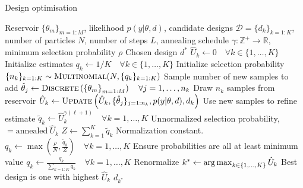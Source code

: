 \begin{algorithm}[t]
	\small
	\captionsetup{labelfont=bf, justification=justified,singlelinecheck=false}
	\caption{Design optimisation \label{alg:des-opt}}
	\begin{algorithmic}[1]
		\renewcommand{\algorithmicrequire}{\textbf{Inputs:}}
		\renewcommand{\algorithmicensure}{\textbf{Outputs:}}				 
		\Require Reservoir $\{\theta_m\}_{m=1:M}$, likelihood $p(y | \theta, d)$,
		candidate designs $\mathcal{D} = \{d_k\}_{k=1:K}$, number of particles $N$, number of steps
		$L$, annealing schedule $\gamma : \mathbb{Z}^+ \rightarrow \mathbb{R}$, minimum selection probability $\rho$
		\Ensure Chosen design $d^*$
		\State $\hat{U}_k \leftarrow 0 \quad \forall k \in \{1,\dots,K\}$ \Comment Initialize estimates
		\State $q_k \leftarrow 1/K \quad \forall k \in \{1,\dots,K\}$ \Comment Initialize selection probability
		\State $\{n_k\}_{k=1:K} \sim \textsc{Multinomial}(N,\{q_k\}_{k=1:K})$ \label{line:des-opt:sample-nsamples}
		\Comment Sample number of new samples to add
		\State $\hat{\theta}_{j} \leftarrow \textsc{Discrete}\left(\left\{\theta_m\right\}_{m=1:M}\right) \quad \forall j=1,\dots,n_k$ \label{line:des-opt:draw-theta}
		\Comment Draw $n_k$ samples from reservoir
		\State $\hat{U}_k \leftarrow \textsc{Update}\left(\hat{U}_k,\{\hat{\theta}_j\}_{j=1:n_k},p(y | \theta, d),d_k\right)$
		\label{line:des-opt:refine-U}
		\Comment Use new samples to refine estimate %
		\EndFor	
		\State $\tilde{q}_k \leftarrow \hat{U}_k^{\gamma(\ell+1)} \quad \forall k = 1,\dots,K$ 
		\label{line:des-opt:set-p}
		\Comment Unnormalized selection probability, $=\text{annealed} ~\hat{U}_k$
		\State $Z \leftarrow \sum_{k=1}^{K} \tilde{q}_k $ \Comment Normalization constant.
		\State $q_k \leftarrow \max\left(\frac{\rho}{N},\frac{\tilde{q}_k }{Z}\right) \quad \forall k = 1,\dots,K$ \Comment Ensure probabilities are all at least minimum value
		\State $q_k \leftarrow \frac{q_k}{\sum_{k=1:K} q_k} \quad \forall k = 1,\dots,K$ 
		\label{line:des-opt:renorm}
		\Comment Renormalize
		\EndFor	
		\State $k^* \leftarrow \operatorname*{arg\,max}_{k \in \{1,\dots,K\}} \hat{U}_k$ \Comment Best design is one with highest $\hat{U}_k$
		\State \Return $d_{k^*}$
	\end{algorithmic}
\end{algorithm}

